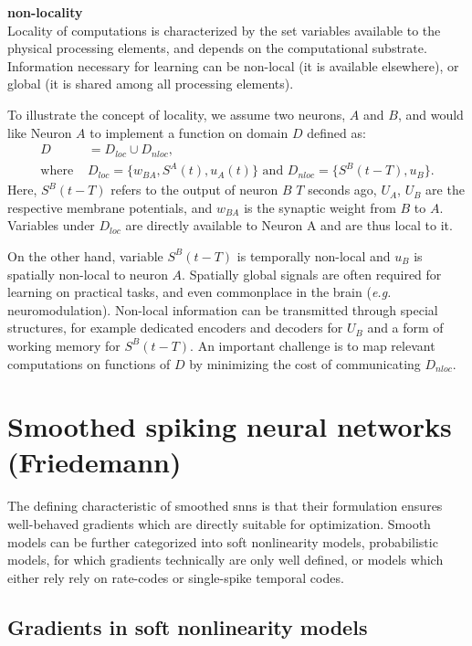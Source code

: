 \documentclass[journal,onecolumn,11pt]{IEEEtran}
\begin{document}
{\bf non-locality}\\
Locality of computations is characterized by the set variables available to the physical processing elements, and depends on the computational substrate.
Information necessary for learning can be non-local (it is available elsewhere), or global (it is shared among all processing elements).

To illustrate the concept of locality, we assume two neurons, $A$ and $B$, and would like Neuron $A$ to implement a function on domain $D$ defined as:
\[ 
  \begin{split}
    D & = D_{loc} \cup D_{nloc},\\
    \text{where } &D_{loc}=\{w_{BA},S^A(t), u_A(t)\}\text{ and }D_{nloc} = \{ S^B(t-T), u_{B}\}.
  \end{split}
\]
Here, $S^B(t-T)$ refers to the output of neuron $B$ $T$ seconds ago, $U_A$, $U_B$ are the respective membrane potentials, and $w_{BA}$ is the synaptic weight from $B$ to $A$.  
Variables under $D_{loc}$ are directly available to Neuron A and are thus local to it. 
  
On the other hand, variable $S^B(t-T)$ is temporally non-local and $u_{B}$ is spatially non-local to neuron $A$.
Spatially global signals are often required for learning on practical tasks, and even commonplace in the brain (\emph{e.g.} neuromodulation).
Non-local information can be transmitted through special structures, for example dedicated encoders and decoders for $U_B$ and a form of working memory for $S^B(t-T)$.
An important challenge is to map relevant computations on functions of $D$ by minimizing the cost of communicating $D_{nloc}$.

\section{Smoothed spiking neural networks (Friedemann)}

The defining characteristic of smoothed \glspl{snn} is that their formulation
ensures well-behaved gradients which are directly suitable for optimization.
Smooth models can be further categorized into soft nonlinearity models,  
probabilistic models, for which gradients technically are only
well defined, or models which either rely rely on rate-codes or
single-spike temporal codes.  


\subsection{Gradients in soft nonlinearity models}
\end{document}
